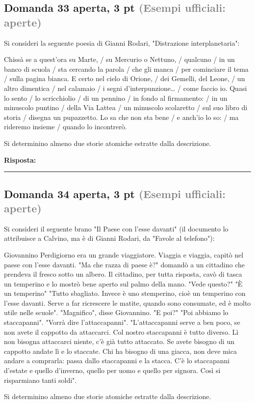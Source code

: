 \documentclass[a4paper,11pt]{article}
\begin{document}
\subsection*{Domanda 33 \hfill {\small aperta, 3 pt \textcolor{gray}{(Esempi ufficiali: aperte)}}}
\begin{tcolorbox}[colback=gray!8,colframe=gray!50,title=Contesto]
Si consideri la seguente poesia di Gianni Rodari, "Distrazione interplanetaria":

Chissà se a quest'ora su Marte, / su Mercurio o Nettuno, / qualcuno / in un banco di scuola / sta cercando la parola / che gli manca / per cominciare il tema / sulla pagina bianca.
E certo nel cielo di Orione, / dei Gemelli, del Leone, / un altro dimentica / nel calamaio / i segni d'interpunzione… / come faccio io.
Quasi lo sento / lo scricchiolio / di un pennino / in fondo al firmamento: / in un minuscolo puntino / della Via Lattea / un minuscolo scolaretto / sul suo libro di storia / disegna un pupazzetto.
Lo sa che non sta bene / e anch'io lo so: / ma rideremo insieme / quando lo incontrerò.
\end{tcolorbox}
Si determinino almeno due storie atomiche estratte dalla descrizione.

\vspace{0.2cm}
\noindent\textbf{Risposta:}\par
\vspace{4cm}\hrule


\subsection*{Domanda 34 \hfill {\small aperta, 3 pt \textcolor{gray}{(Esempi ufficiali: aperte)}}}
\begin{tcolorbox}[colback=gray!8,colframe=gray!50,title=Contesto]
Si consideri il seguente brano "Il Paese con l'esse davanti" (il documento lo attribuisce a Calvino, ma è di Gianni Rodari, da "Favole al telefono"):

Giovannino Perdigiorno era un grande viaggiatore. Viaggia e viaggia, capitò nel paese con l'esse davanti.
"Ma che razza di paese è?" domandò a un cittadino che prendeva il fresco sotto un albero. Il cittadino, per tutta risposta, cavò di tasca un temperino e lo mostrò bene aperto sul palmo della mano. "Vede questo?" "È un temperino" "Tutto sbagliato. Invece è uno stemperino, cioè un temperino con l'esse davanti. Serve a far ricrescere le matite, quando sono consumate, ed è molto utile nelle scuole". "Magnifico", disse Giovannino. "E poi?" "Poi abbiamo lo staccapanni". "Vorrà dire l'attaccapanni". "L'attaccapanni serve a ben poco, se non avete il cappotto da attaccarci. Col nostro staccapanni è tutto diverso. Lì non bisogna attaccarci niente, c'è già tutto attaccato. Se avete bisogno di un cappotto andate lì e lo staccate. Chi ha bisogno di una giacca, non deve mica andare a comprarla: passa dallo staccapanni e la stacca. C'è lo staccapanni d'estate e quello d'inverno, quello per uomo e quello per signora. Così si risparmiano tanti soldi".
\end{tcolorbox}
Si determinino almeno due storie atomiche estratte dalla descrizione.
\end{document}
